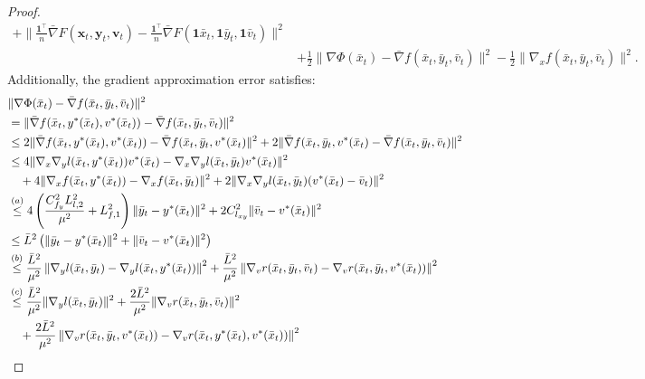 \documentclass{article}
\theoremstyle{plain}
\theoremstyle{definition}
\theoremstyle{remark}
\begin{document}
\begin{proof}
\begin{align}
+ \bigg\|\frac{\mathbf{1}^\top}{n} \bar{\nabla} F(\mathbf{x}_t, \mathbf{y}_t, \mathbf{v}_t) - \frac{\mathbf{1}^\top}{n}\bar{\nabla} F(\mathbf{1}\bar{x}_t, \mathbf{1}\bar{y}_t, \mathbf{1}\bar{v}_t)\bigg\|^2 \nonumber\\
&+ \frac{1}{2}\|\nabla \Phi(\bar{x}_t) -\bar{\nabla} f(\bar{x}_t, \bar{y}_t, \bar{v}_t)\|^2- \frac{1}{2}\|\nabla_x f(\bar{x}_t, \bar{y}_t,\bar{v}_t)\|^2.\label{eq34}
\end{align}
Additionally, the gradient approximation error satisfies:
\begin{align}
&\|\nabla \Phi(\bar{x}_t) -\bar{\nabla} f(\bar{x}_t, \bar{y}_t, \bar{v}_t)\|^2 \nonumber\\
&= \|\bar{\nabla} f(\bar{x}_t, y^*(\bar{x}_t), v^*(\bar{x}_t)) - \bar{\nabla} f(\bar{x}_t, \bar{y}_t, \bar{v}_t)\|^2 \nonumber\\
&\leq 2 \|\bar{\nabla} f(\bar{x}_t, y^*(\bar{x}_t), v^*(\bar{x}_t)) - \bar{\nabla} f(\bar{x}_t, \bar{y}_t, v^*(\bar{x}_t)\|^2 + 2 \|\bar{\nabla} f(\bar{x}_t, \bar{y}_t, v^*(\bar{x}_t) - \bar{\nabla} f(\bar{x}_t, \bar{y}_t, \bar{v}_t)\|^2 \nonumber\\
&\leq 4 \|\nabla_x \nabla_y l(\bar{x}_t, y^*(\bar{x}_t)) v^*(\bar{x}_t) - \nabla_x \nabla_y l(\bar{x}_t, \bar{y}_t) v^*(\bar{x}_t)\|^2 \nonumber\\
&\quad + 4 \|\nabla_x f(\bar{x}_t, y^*(\bar{x}_t)) - \nabla_x f(\bar{x}_t, \bar{y}_t)\|^2 
+ 2 \|\nabla_x \nabla_y l(\bar{x}_t, \bar{y}_t) (v^*(\bar{x}_t) - \bar{v}_t)\|^2 \nonumber\\
&\overset{(a)}{\leq} 4 \left( \frac{C_{f_y}^2 L_{l,2}^2}{\mu^2} + L_{f,1}^2 \right) \|\bar{y}_t - y^*(\bar{x}_t)\|^2 
+ 2 C_{l_{xy}}^2 \|\bar{v}_t - v^*(\bar{x}_t)\|^2 \nonumber\\
&\leq \bar{L}^2 \left( \|\bar{y}_t - y^*(\bar{x}_t)\|^2 + \|\bar{v}_t - v^*(\bar{x}_t)\|^2 \right)\nonumber\\
&\overset{(b)}{\leq} \frac{\bar{L}^2}{\mu^2} \left\| \nabla_y l(\bar{x}_t, \bar{y}_t) - \nabla_y l(\bar{x}_t, y^*(\bar{x}_t)) \right\|^2 
+ \frac{\bar{L}^2}{\mu^2} \left\| \nabla_v r(\bar{x}_t, \bar{y}_t, \bar{v}_t) - \nabla_v r(\bar{x}_t, \bar{y}_t, v^*(\bar{x}_t)) \right\|^2 \nonumber \\
&\overset{(c)}{\leq} \frac{\bar{L}^2}{\mu^2} \|\nabla_y l(\bar{x}_t, \bar{y}_t)\|^2 
+ \frac{2\bar{L}^2}{\mu^2} \|\nabla_v r(\bar{x}_t, \bar{y}_t, \bar{v}_t)\|^2 \notag\\
&\quad+ \frac{2\bar{L}^2}{\mu^2} \left\| \nabla_v r(\bar{x}_t, \bar{y}_t, v^*(\bar{x}_t)) - \nabla_v r(\bar{x}_t, y^*(\bar{x}_t), v^*(\bar{x}_t)) \right\|^2 \nonumber \\

\end{align}
\end{proof}
\end{document}
